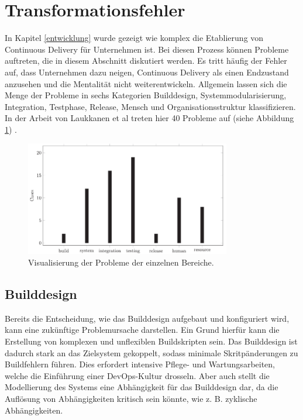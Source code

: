 \section{Transformationsfehler} \label{Fehler bei der Transformation}
In Kapitel \ref{entwicklung} wurde gezeigt wie komplex die Etablierung von Continuous Delivery für Unternehmen ist. Bei diesen Prozess können Probleme auftreten, die in diesem Abschnitt diskutiert werden. Es tritt häufig der Fehler auf, dass Unternehmen dazu neigen, Continuous Delivery als einen Endzustand anzusehen und die Mentalität nicht weiterentwickeln. Allgemein lassen sich die Menge der Probleme in sechs Kategorien Builddesign, Systemmodularisierung, Integration, Testphase, Release, Mensch und Organisationsstruktur klassifizieren. In der Arbeit von Laukkanen et al treten hier 40 Probleme auf (siehe Abbildung \ref{studie}) \cite{Laukkanen.2017}. 

\begin{figure}[ht]
	\centering
	\includegraphics[width=0.8\textwidth,]{images/Transformationproblems}
	\caption{Visualisierung der Probleme der einzelnen Bereiche\cite{Laukkanen.2017}.}
	\label{studie}
\end{figure}

\subsection{Builddesign} \label{builddesgin}
Bereits die Entscheidung, wie das Builddesign aufgebaut und konfiguriert wird, kann eine zukünftige Problemursache darstellen. Ein Grund hierfür kann die Erstellung von komplexen und unflexiblen Buildskripten sein. Das Builddesign ist dadurch stark an das Zielsystem gekoppelt, sodass minimale Skritpänderungen zu Buildfehlern führen. Dies erfordert intensive Pflege- und Wartungsarbeiten, welche die Einführung einer DevOps-Kultur drosseln. Aber auch stellt die Modellierung des Systems eine Abhängigkeit für das Builddesign dar, da die Auflösung von Abhängigkeiten kritisch sein könnte, wie z. B. zyklische Abhängigkeiten.

